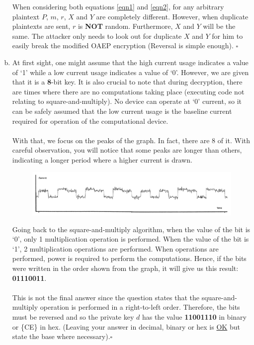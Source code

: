 \documentclass[12pt]{article}
\newcommand{\EOQ}{\hfill $\square$}
\begin{document}
\begin{enumerate}[(a)]
When considering both equations \eqref{eqn1} and \eqref{eqn2}, for any arbitrary plaintext $P$, $m$, $r$, $X$ and $Y$ are completely different. However, when duplicate plaintexts are sent, $r$ is \textbf{NOT} random. Furthermore, $X$ and $Y$ will be the same. The attacker only needs to look out for duplicate $X$ and $Y$ for him to easily break the modified OAEP encryption (Reversal is simple enough). \EOQ
\item At first sight, one might assume that the high current usage indicates a value of `1' while a low current usage indicates a value of `0'. However, we are given that it is a \textbf{8}-bit key. It is also crucial to note that during decryption, there are times where there are no computations taking place (executing code not relating to square-and-multiply). No device can operate at `0' current, so it can be safely assumed that the low current usage is the baseline current required for operation of the computational device.\\\\With that, we focus on the peaks of the graph. In fact, there are 8 of it. With careful observation, you will notice that some peaks are longer than others, indicating a longer period where a higher current is drawn.
\begin{figure}[H]
\centering
\includegraphics[width=1\linewidth]{Capture}
\label{fig:capture2}
\end{figure}
Going back to the square-and-multiply algorithm, when the value of the bit is `0', only 1 multiplication operation is performed. When the value of the bit is `1', 2 multiplication operations are performed. When operations are performed, power is required to perform the computations. Hence, if the bits were written in the order shown from the graph, it will give us this result: \textbf{01110011}.\\\\This is not the final answer since the question states that the square-and-multiply operation is performed in a right-to-left order. Therefore, the bits must be reversed and so the private key $d$ has the value \textbf{11001110} in binary or \{CE\} in hex. (Leaving your answer in decimal, binary or hex is \underline{OK} but state the base where necessary).\EOQ
\end{enumerate}
\end{document}
